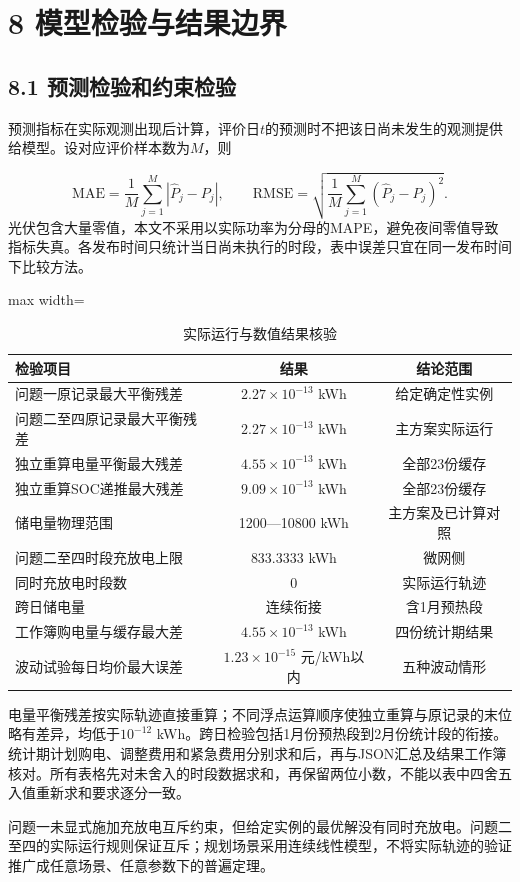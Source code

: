 \documentclass[UTF8,a4paper,zihao=-4,fontset=windows]{ctexart}
\begin{document}
\section{8 模型检验与结果边界}
\subsection{8.1 预测检验和约束检验}
预测指标在实际观测出现后计算，评价日$t$的预测时不把该日尚未发生的观测提供给模型。设对应评价样本数为$M$，则
\par
\begin{equation}
\mathrm{MAE}=\frac1M\sum_{j=1}^M|\widehat P_j-P_j|,\qquad
\mathrm{RMSE}=\sqrt{\frac1M\sum_{j=1}^M(\widehat P_j-P_j)^2}. \tag{20}
\end{equation}
光伏包含大量零值，本文不采用以实际功率为分母的MAPE，避免夜间零值导致指标失真。各发布时间只统计当日尚未执行的时段，表中误差只宜在同一发布时间下比较方法。
\par
\begin{table}[H]\centering
\fontsize{9.5}{12}\selectfont\setlength{\tabcolsep}{4pt}\renewcommand{\arraystretch}{1.12}
\begin{adjustbox}{max width=\linewidth}\begin{tabular}{lcc}\toprule
\textbf{检验项目} & \textbf{结果} & \textbf{结论范围}\\\midrule
问题一原记录最大平衡残差 & $2.27\times10^{-13}$ kWh & 给定确定性实例\\
问题二至四原记录最大平衡残差 & $2.27\times10^{-13}$ kWh & 主方案实际运行\\
独立重算电量平衡最大残差 & $4.55\times10^{-13}$ kWh & 全部23份缓存\\
独立重算SOC递推最大残差 & $9.09\times10^{-13}$ kWh & 全部23份缓存\\
储电量物理范围 & 1200—10800 kWh & 主方案及已计算对照\\
问题二至四时段充放电上限 & 833.3333 kWh & 微网侧\\
同时充放电时段数 & 0 & 实际运行轨迹\\
跨日储电量 & 连续衔接 & 含1月预热段\\
工作簿购电量与缓存最大差 & $4.55\times10^{-13}$ kWh & 四份统计期结果\\
波动试验每日均价最大误差 & $1.23\times10^{-15}$ 元/kWh以内 & 五种波动情形\\
\bottomrule\end{tabular}\end{adjustbox}
\caption{实际运行与数值结果核验}
\end{table}
电量平衡残差按实际轨迹直接重算；不同浮点运算顺序使独立重算与原记录的末位略有差异，均低于$10^{-12}$ kWh。跨日检验包括1月份预热段到2月份统计段的衔接。统计期计划购电、调整费用和紧急费用分别求和后，再与JSON汇总及结果工作簿核对。所有表格先对未舍入的时段数据求和，再保留两位小数，不能以表中四舍五入值重新求和要求逐分一致。
\par
问题一未显式施加充放电互斥约束，但给定实例的最优解没有同时充放电。问题二至四的实际运行规则保证互斥；规划场景采用连续线性模型，不将实际轨迹的验证推广成任意场景、任意参数下的普遍定理。
\par
\end{document}
